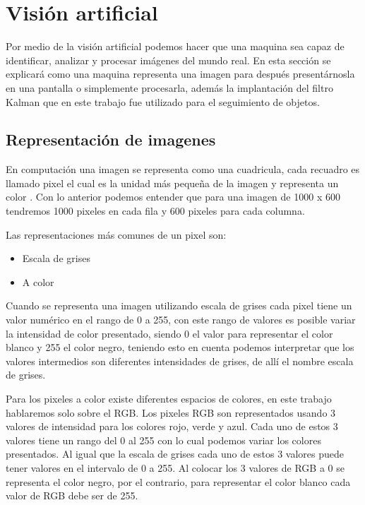 \section{Visión artificial}

Por medio de la visión artificial podemos hacer que una maquina sea capaz de identificar, analizar y procesar imágenes del mundo real. En esta sección se explicará como una maquina representa una imagen para después presentárnosla en una pantalla o simplemente procesarla, además la implantación del filtro Kalman que en este trabajo fue utilizado para el seguimiento de objetos.

\subsection{Representación de imagenes}

En computación una imagen se representa como una cuadricula, cada recuadro es llamado pixel el cual es la unidad más pequeña de la imagen y representa un color \cite{rosebrock2017deep}. Con lo anterior podemos entender que para una imagen de 1000 x 600 tendremos 1000 pixeles en cada fila y 600 pixeles para cada columna.

Las representaciones más comunes de un pixel son:

\begin{itemize}
\item Escala de grises
\item A color
\end{itemize}


Cuando se representa una imagen utilizando escala de grises cada pixel tiene un valor numérico en el rango de 0 a 255, con este rango de valores es posible variar la intensidad de color presentado, siendo 0 el valor para representar el color blanco y 255 el color negro, teniendo esto en cuenta podemos interpretar que los valores intermedios son diferentes intensidades de grises, de allí el nombre escala de grises.

Para los pixeles a color existe diferentes espacios de colores, en este trabajo hablaremos solo sobre el RGB. Los pixeles RGB son representados usando 3 valores de intensidad para los colores rojo, verde y azul. Cada uno de estos 3 valores tiene un rango del 0 al 255 con lo cual podemos variar los colores presentados. Al igual que la escala de grises cada uno de estos 3 valores puede tener valores en el intervalo de 0 a 255. Al colocar los 3 valores de RGB a 0 se representa el color negro, por el contrario, para representar el color blanco cada valor de RGB debe ser de 255.

